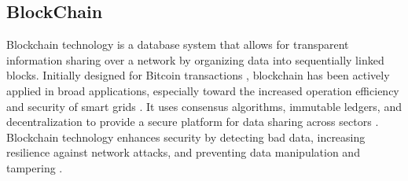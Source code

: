 \documentclass[10pt, journal]{IEEEtran}
\begin{document}




\subsection{BlockChain}
  
Blockchain technology is a database system that allows for transparent information sharing over a network by organizing data into sequentially linked blocks. Initially designed for Bitcoin transactions \cite{nakamoto2008bitcoin}, blockchain has been actively applied in broad applications, especially toward the increased operation efficiency and security of smart grids \cite{zhuang2020blockchain}. It uses consensus algorithms, immutable ledgers, and decentralization to provide a secure platform for data sharing across sectors \cite{winter2018advantages}. Blockchain technology enhances security by detecting bad data, increasing resilience against network attacks, and preventing data manipulation and tampering \cite{yue2017big, mylrea2017blockchain, kurt2019secure, ghiasi2023comprehensive}.

\end{document}
